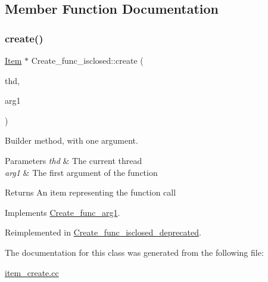 \subsection{Member Function Documentation}
\mbox{\label{classCreate__func__isclosed_a1df58b5c9845fbf47e2fe5bb6978b428}} 
\subsubsection{\texorpdfstring{create()}{create()}}
{\footnotesize\ttfamily \mbox{\hyperlink{classItem}{Item}} $\ast$ Create\+\_\+func\+\_\+isclosed\+::create (\begin{DoxyParamCaption}\item[{T\+HD $\ast$}]{thd,  }\item[{\mbox{\hyperlink{classItem}{Item}} $\ast$}]{arg1 }\end{DoxyParamCaption})\hspace{0.3cm}{\ttfamily [virtual]}}

Builder method, with one argument. 
\begin{DoxyParams}{Parameters}
{\em thd} & The current thread \\
\hline
{\em arg1} & The first argument of the function \\
\hline
\end{DoxyParams}
\begin{DoxyReturn}{Returns}
An item representing the function call 
\end{DoxyReturn}


Implements \mbox{\hyperlink{classCreate__func__arg1_a3e9a98f755cd82c3e762e334c955a8c9}{Create\+\_\+func\+\_\+arg1}}.



Reimplemented in \mbox{\hyperlink{classCreate__func__isclosed__deprecated_a9db69e516a3c72b229cc4fe0660adad8}{Create\+\_\+func\+\_\+isclosed\+\_\+deprecated}}.



The documentation for this class was generated from the following file\+:\begin{DoxyCompactItemize}
\item 
\mbox{\hyperlink{item__create_8cc}{item\+\_\+create.\+cc}}\end{DoxyCompactItemize}
